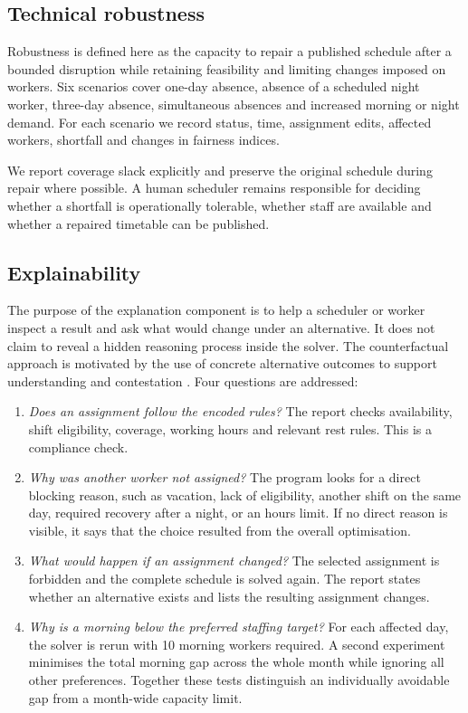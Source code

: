 \documentclass[11pt,a4paper]{article}
\begin{document}
\subsection{Technical robustness}

Robustness is defined here as the capacity to repair a published schedule after a bounded disruption while retaining feasibility and limiting changes imposed on workers. Six scenarios cover one-day absence, absence of a scheduled night worker, three-day absence, simultaneous absences and increased morning or night demand. For each scenario we record status, time, assignment edits, affected workers, shortfall and changes in fairness indices.

We report coverage slack explicitly and preserve the original schedule during repair where possible. A human scheduler remains responsible for deciding whether a shortfall is operationally tolerable, whether staff are available and whether a repaired timetable can be published.

\subsection{Explainability}

The purpose of the explanation component is to help a scheduler or worker inspect a result and ask what would change under an alternative. It does not claim to reveal a hidden reasoning process inside the solver. The counterfactual approach is motivated by the use of concrete alternative outcomes to support understanding and contestation \cite{wachter}. Four questions are addressed:

\begin{enumerate}
  \item \emph{Does an assignment follow the encoded rules?} The report checks availability, shift eligibility, coverage, working hours and relevant rest rules. This is a compliance check.
  \item \emph{Why was another worker not assigned?} The program looks for a direct blocking reason, such as vacation, lack of eligibility, another shift on the same day, required recovery after a night, or an hours limit. If no direct reason is visible, it says that the choice resulted from the overall optimisation.
  \item \emph{What would happen if an assignment changed?} The selected assignment is forbidden and the complete schedule is solved again. The report states whether an alternative exists and lists the resulting assignment changes.
  \item \emph{Why is a morning below the preferred staffing target?} For each affected day, the solver is rerun with 10 morning workers required. A second experiment minimises the total morning gap across the whole month while ignoring all other preferences. Together these tests distinguish an individually avoidable gap from a month-wide capacity limit.
\end{enumerate}
\end{document}

